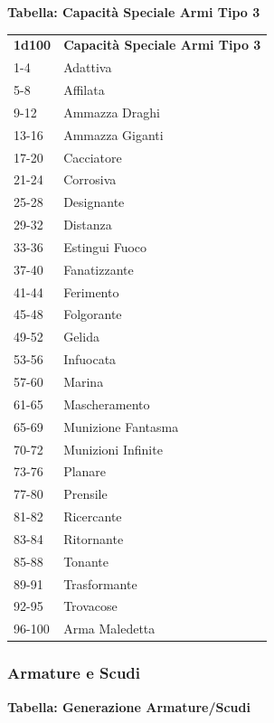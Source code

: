 \begin{multicols}{2}
	\textbf{Tabella: Capacità Speciale Armi Tipo 3}

	\medskip

	\begin{tabular}{ll}
		\textbf{1d100} & \textbf{Capacità Speciale Armi Tipo 3}\\
		1-4& Adattiva\\
		5-8 &Affilata\\
		9-12& Ammazza Draghi\\
		13-16& Ammazza Giganti\\
		17-20 &Cacciatore\\
		21-24 &Corrosiva\\
		25-28& Designante\\
		29-32& Distanza\\
		33-36& Estingui Fuoco\\
		37-40 &Fanatizzante\\
		41-44 &Ferimento\\
		45-48 &Folgorante\\
		49-52 &Gelida\\
		53-56 &Infuocata\\
		57-60 &Marina\\
		61-65 &Mascheramento\\
		65-69 &Munizione Fantasma\\
		70-72 &Munizioni Infinite\\
		73-76 &Planare\\
		77-80 &Prensile\\
		81-82 &Ricercante\\
		83-84 &Ritornante\\
		85-88 &Tonante\\
		89-91 &Trasformante\\
		92-95& Trovacose\\
		96-100 & Arma Maledetta\\
	\end{tabular}

	\medskip

	\subsubsection{Armature e Scudi}

	\textbf{Tabella: Generazione Armature/Scudi}

	\medskip


\end{multicols}
